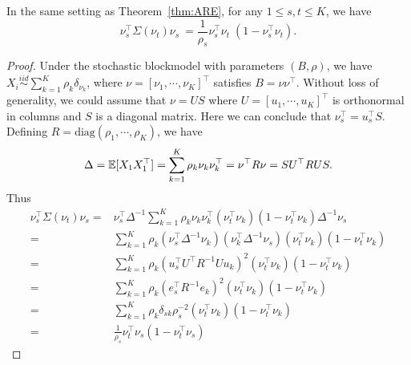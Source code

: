 \begin{lemma}
\label{lm:mseForm}
In the same setting as Theorem~\ref{thm:ARE}, for any $1 \le s, t \le K$, we have
\[
	\nu_s^{\top} \Sigma(\nu_t) \nu_s^{\phantom{\top}} = \frac{1}{\rho_s} \nu_s^{\top} \nu_t^{\phantom{\top}} (1- \nu_s^{\top} \nu_t).
\]
\end{lemma}
\begin{proof}
Under the stochastic blockmodel with parameters $(B, \rho)$, we have $X_i \stackrel{iid}{\sim} \sum_{k=1}^K \rho_k \delta_{\nu_k}$, where $\nu = [\nu_1, \cdots, \nu_K]^{\top}$ satisfies $B = \nu \nu^{\top}$. Without loss of generality, we could assume that $\nu = U S$ where $U = [u_1, \cdots, u_K]^{\top}$ is orthonormal in columns and $S$ is a diagonal matrix. Here we can conclude that $\nu_s^{\top} = u_s^{\top} S$. Defining $R = \text{diag}(\rho_1, \cdots, \rho_K)$, we have
\[
	\Delta = \mathbb{E}[X_1 X_1^{\top}] = \sum_{k=1}^K \rho_k \nu_k \nu_k^{\top} = \nu^{\top} R \nu = S U^{\top} R U S.
\]
Thus
\begin{align*}
	\nu_s^{\top} \Sigma(\nu_t) \nu_s = &
    \nu_s^{\top} \Delta^{-1} \sum_{k=1}^K \rho_k \nu_k \nu_k^{\top} (\nu_t^{\top} \nu_k)(1 - \nu_t^{\top} \nu_k) \Delta^{-1} \nu_s \\
    = & \sum_{k=1}^K \rho_k (\nu_s^{\top} \Delta^{-1} \nu_k) (\nu_k^{\top} \Delta^{-1} \nu_s) (\nu_t^{\top} \nu_k) (1 - \nu_t^{\top} \nu_k) \\
    = & \sum_{k=1}^K \rho_k (u_s^{\top} U^{\top} R^{-1} U u_k)^2 (\nu_t^{\top} \nu_k) (1 - \nu_t^{\top} \nu_k) \\
    = & \sum_{k=1}^K \rho_k (e_s^{\top} R^{-1} e_k)^2 (\nu_t^{\top} \nu_k) (1 - \nu_t^{\top} \nu_k) \\
    = & \sum_{k=1}^K \rho_k \delta_{sk} \rho_s^{-2} (\nu_t^{\top} \nu_k) (1 - \nu_t^{\top} \nu_k) \\
    = & \frac{1}{\rho_s} \nu_t^{\top} \nu_s (1 - \nu_t^{\top} \nu_s)
\end{align*}
\end{proof}


